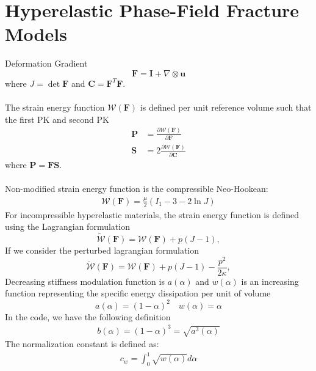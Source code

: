 \documentclass[12pt,3p]{article}
\numberwithin{equation}{section}
\begin{document}
\section{Hyperelastic Phase-Field Fracture Models}
Deformation Gradient 
\begin{equation}\label{EqDefGrad}
\mathbf{F}=\mathbf{I}+\nabla\otimes\bm{u}
\end{equation}
where $J=\det \mathbf{F}$ and $\mathbf{C}=\mathbf{F}^T\mathbf{F}$. \\ \\
The strain energy function $\mathcal{W}(\mathbf{F})$ is defined per unit reference volume such that the first PK and second PK
\begin{subequations}\label{EqPK}
\begin{align}
\mathbf{P} &= \frac{\partial \mathcal{W}(\mathbf{F})}{\partial \mathbf{F}} \\
\mathbf{S} &= 2 \frac{\partial \mathcal{W}(\mathbf{F})}{\partial \mathbf{C}}
\end{align}
\end{subequations}
where $\mathbf{P}=\mathbf{F}\mathbf{S}$. \\ \\
Non-modified strain energy function is the compressible Neo-Hookean:
\begin{align}\label{StrainEnergyNH}
\mathcal{W}(\mathbf{F}) = \frac{\mu}{2} (I_1 - 3 - 2 \ln J)
\end{align}
For incompressible hyperelastic materials, the strain energy function  is defined using the Lagrangian formulation 
\begin{equation}\label{EqEnergyIncompressible}
\widetilde{\mathcal{W}}(\mathbf{F}) = \mathcal{W}(\mathbf{F}) + p\left(J-1\right),
\end{equation}
If we consider the perturbed lagrangian formulation 
\begin{equation}\label{EqPLagrangian}
\widetilde{\mathcal{W}}(\mathbf{F}) = \mathcal{W}(\mathbf{F}) + p\left(J-1\right) - \frac{p^2}{2 \kappa}, 
\end{equation}
Decreasing stiffness modulation function is $a (\alpha)$ and $w(\alpha)$ is an increasing function representing the specific energy dissipation per unit of volume
\begin{equation}\label{EqStiffMod}
a (\alpha) = (1 - \alpha)^2 \quad w(\alpha) = \alpha
\end{equation}
In the code, we have the following definition
\begin{align*}
b (\alpha) = (1 - \alpha)^3 = \sqrt{a^3(\alpha)}
\end{align*}
The normalization constant is defined as: 
\begin{align}\label{NormConst} %
c_w=\int_0^1\sqrt{w(\alpha)}d\alpha
\end{align} 
\end{document}
